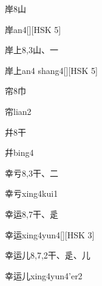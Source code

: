 \begin{entry}{岸}{8}{⼭}
  \begin{phonetics}{岸}{an4}[][HSK 5]
  \end{phonetics}
\end{entry}

\begin{entry}{岸上}{8,3}{⼭、⼀}
  \begin{phonetics}{岸上}{an4 shang4}[][HSK 5]
  \end{phonetics}
\end{entry}

\begin{entry}{帘}{8}{⼱}
  \begin{phonetics}{帘}{lian2}
  \end{phonetics}
\end{entry}

\begin{entry}{幷}{8}{⼲}
  \begin{phonetics}{幷}{bing4}
  \end{phonetics}
\end{entry}

\begin{entry}{幸亏}{8,3}{⼲、⼆}
  \begin{phonetics}{幸亏}{xing4kui1}
  \end{phonetics}
\end{entry}

\begin{entry}{幸运}{8,7}{⼲、⾡}
  \begin{phonetics}{幸运}{xing4yun4}[][HSK 3]
  \end{phonetics}
\end{entry}

\begin{entry}{幸运儿}{8,7,2}{⼲、⾡、⼉}
  \begin{phonetics}{幸运儿}{xing4yun4'er2}
  \end{phonetics}
\end{entry}

